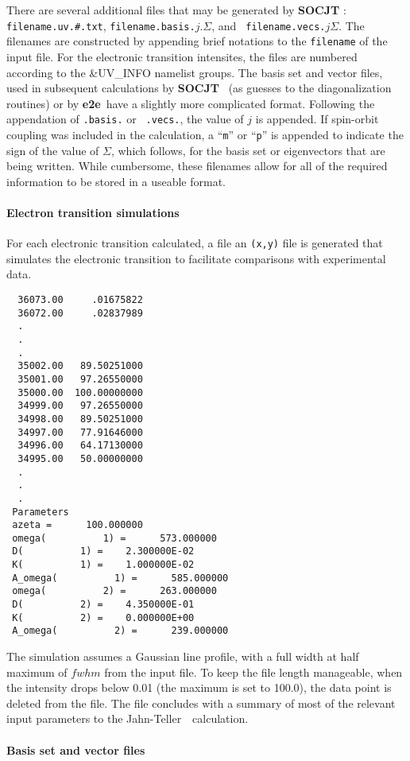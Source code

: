 \documentclass{article}
\newcommand{\JT}{Jahn-Teller\ }
\newcommand{\socjt}{{\bf SOCJT }}
\newcommand{\etoe}{{\bf e2e}}
\begin{document}
There are several additional files that may be generated by \socjt :
{\tt filename.uv.\#.txt}, {\tt filename.basis.}$j.\Sigma $, and {\tt
  filename.vecs.}$j\Sigma $. The filenames are constructed by
appending brief notations to the {\tt filename} of the input file. For
the electronic transition intensites, the files are numbered according
to the \&UV\_INFO namelist groups. The basis set and vector files,
used in subsequent calculations by \socjt\ (as guesses to the
diagonalization routines) or by \etoe\ have a slightly more
complicated format. Following the appendation of {\tt .basis.} or {\tt
  .vecs.}, the value of $j$ is appended. If spin-orbit coupling was
included in the calculation, a ``{\tt m}'' or ``{\tt p}'' is appended
to indicate the sign of the value of $\Sigma $, which follows, for the
basis set or eigenvectors that are being written. While cumbersome,
these filenames allow for all of the required information to be stored
in a useable format.

\paragraph{Electron transition simulations}
For each electronic transition calculated, a file an {\tt (x,y)} file
is generated that simulates the electronic transition to facilitate
comparisons with experimental data. 
\begin{verbatim}
  36073.00     .01675822
  36072.00     .02837989
  .
  .
  .
  35002.00   89.50251000
  35001.00   97.26550000
  35000.00  100.00000000
  34999.00   97.26550000
  34998.00   89.50251000
  34997.00   77.91646000
  34996.00   64.17130000
  34995.00   50.00000000
  .
  .
  .
 Parameters
 azeta =      100.000000
 omega(          1) =      573.000000
 D(          1) =    2.300000E-02
 K(          1) =    1.000000E-02
 A_omega(          1) =      585.000000
 omega(          2) =      263.000000
 D(          2) =    4.350000E-01
 K(          2) =    0.000000E+00
 A_omega(          2) =      239.000000
\end{verbatim}
The simulation assumes a Gaussian
line profile, with a full width at half maximum of $fwhm$ from the
input file. To keep the file length manageable, when the intensity
drops below 0.01 (the maximum is set to 100.0), the data point is
deleted from the file. The file concludes with a summary of most of
the relevant input parameters to the \JT\ calculation.

\paragraph{Basis set and vector files}
\end{document}
